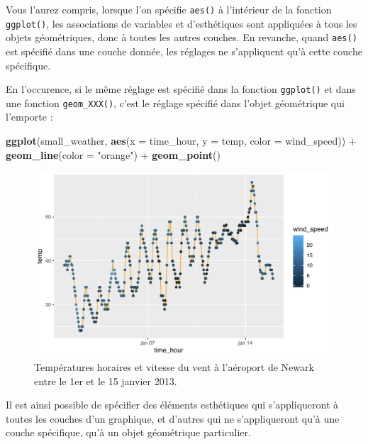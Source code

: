 \documentclass[
  a4paper,
]{article}
\newenvironment{Shaded}{\begin{snugshade}}{\end{snugshade}}
\newcommand{\DataTypeTok}[1]{\textcolor[rgb]{0.00,0.34,0.68}{#1}}
\newcommand{\KeywordTok}[1]{\textcolor[rgb]{0.12,0.11,0.11}{\textbf{#1}}}
\newcommand{\NormalTok}[1]{\textcolor[rgb]{0.12,0.11,0.11}{#1}}
\newcommand{\OperatorTok}[1]{\textcolor[rgb]{0.12,0.11,0.11}{#1}}
\newcommand{\StringTok}[1]{\textcolor[rgb]{0.75,0.01,0.01}{#1}}
\begin{document}
Vous l'aurez compris, lorsque l'on spécifie \texttt{aes()} à l'intérieur de la fonction \texttt{ggplot()}, les associations de variables et d'esthétiques sont appliquées à tous les objets géométriques, donc à toutes les autres couches. En revanche, quand \texttt{aes()} est spécifié dans une couche donnée, les réglages ne s'appliquent qu'à cette couche spécifique.

En l'occurence, si le même réglage est spécifié dans la fonction \texttt{ggplot()} et dans une fonction \texttt{geom\_XXX()}, c'est le réglage spécifié dans l'objet géométrique qui l'emporte :

\begin{Shaded}
\begin{Highlighting}[]
\KeywordTok{ggplot}\NormalTok{(small_weather, }\KeywordTok{aes}\NormalTok{(}\DataTypeTok{x =}\NormalTok{ time_hour, }\DataTypeTok{y =}\NormalTok{ temp, }\DataTypeTok{color =}\NormalTok{ wind_speed)) }\OperatorTok{+}
\StringTok{  }\KeywordTok{geom_line}\NormalTok{(}\DataTypeTok{color =} \StringTok{"orange"}\NormalTok{) }\OperatorTok{+}
\StringTok{  }\KeywordTok{geom_point}\NormalTok{()}
\end{Highlighting}
\end{Shaded}

\begin{figure}[htpb]

{\centering \includegraphics[width=0.9\linewidth]{figure/wind4-1} 

}

\caption{Températures horaires et vitesse du vent à l'aéroport de Newark entre le 1er et le 15 janvier 2013.}\label{fig:wind4}
\end{figure}

Il est ainsi possible de spécifier des éléments esthétiques qui s'appliqueront à toutes les couches d'un graphique, et d'autres qui ne s'appliqueront qu'à une couche spécifique, qu'à un objet géométrique particulier.
\end{document}

